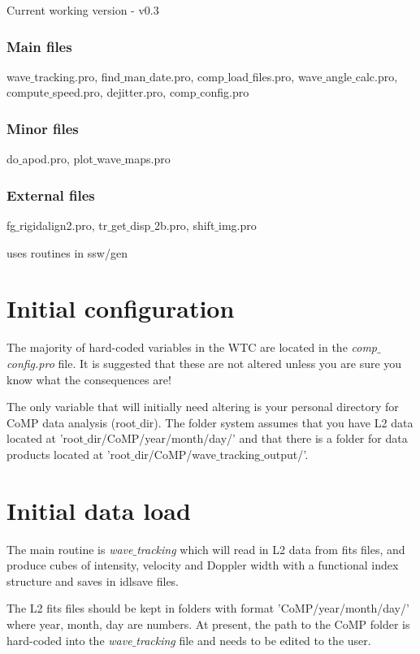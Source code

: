 \documentclass{article}
\begin{document}
Current working version - v0.3

\subsubsection{Main files}
wave$\_$tracking.pro, find$\_$man$\_$date.pro,  comp$\_$load$\_$files.pro, wave$\_$angle$\_$calc.pro, compute$\_$speed.pro, dejitter.pro, comp$\_$config.pro 

\subsubsection{Minor files} 
do$\_$apod.pro, plot$\_$wave$\_$maps.pro

\subsubsection{External files} 
fg$\_$rigidalign2.pro, tr$\_$get$\_$disp$\_$2b.pro, shift$\_$img.pro

uses routines in ssw/gen

\section{Initial configuration}
The majority of hard-coded variables in the WTC are located in the \textit{comp$\_$config.pro} file. It is suggested that these are not
altered unless you are sure you know what the consequences are!

\smallskip

The only variable that will initially need altering is your personal directory for CoMP data analysis ({root$\_$dir}). The folder system assumes that you have L2 data located at 'root$\_$dir/CoMP/year/month/day/' and that there is a folder for data products located at 'root$\_$dir/CoMP/wave$\_$tracking$\_$output/'.



\section{Initial data load}
The main routine is \textit{wave$\_$tracking} which will read in L2 data from fits files, and produce cubes of intensity, 
velocity and Doppler width with a functional index structure and saves in idlsave files. 

\medskip
The L2 fits files should be kept in folders with format 'CoMP/year/month/day/' where year, month, day are numbers. At present,
the path to the CoMP folder is hard-coded into the \textit{wave$\_$tracking} file and needs to be edited to the user.
\end{document}
